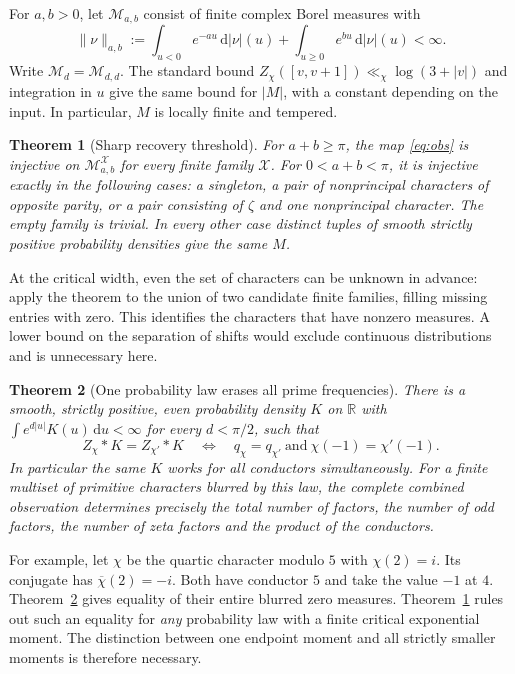 \documentclass[11pt]{article}
\newtheorem{theorem}{Theorem}
\newcommand{\RR}{\mathbb R}
\newcommand{\dd}{\,\mathrm d}
\newcommand{\cX}{\mathcal X}
\newcommand{\cM}{\mathcal M}
\begin{document}
For \(a,b>0\), let \(\cM_{a,b}\) consist of finite complex Borel measures with
\[
 \|\nu\|_{a,b}:=\int_{u<0}e^{-au}\dd|\nu|(u)+
                    \int_{u\ge0}e^{bu}\dd|\nu|(u)<\infty .
\]
Write \(\cM_d=\cM_{d,d}\). The standard bound
\(Z_\chi([v,v+1])\ll_\chi \log(3+|v|)\) \cite{count} and integration in \(u\)
give the same bound for \(|M|\), with a constant depending on the input. In particular, \(M\) is locally finite and tempered.

\begin{theorem}[Sharp recovery threshold]\label{th:main}
For \(a+b\ge\pi\), the map \eqref{eq:obs} is injective on \(\cM_{a,b}^{\cX}\) for every finite family \(\cX\).
For \(0<a+b<\pi\), it is injective exactly in the following cases:
a singleton, a pair of nonprincipal characters of opposite parity, or a pair consisting of \(\zeta\) and one nonprincipal character. The empty family is trivial. In every other case distinct tuples of smooth strictly positive probability densities give the same \(M\).
\end{theorem}

\noindent At the critical width, even the set of characters can be unknown in advance: apply the theorem to the union of two candidate finite families, filling missing entries with zero. This identifies the characters that have nonzero measures. A lower bound on the separation of shifts would exclude continuous distributions and is unnecessary here.

\begin{theorem}[One probability law erases all prime frequencies]\label{th:universal}
There is a smooth, strictly positive, even probability density \(K\) on \(\RR\) with
\(\int e^{d|u|}K(u)\dd u<\infty\) for every \(d<\pi/2\), such that
\[
 Z_{\chi}*K=Z_{\chi'}*K
 \quad\Longleftrightarrow\quad
 q_\chi=q_{\chi'}\ \text{and}\ \chi(-1)=\chi'(-1).
\]
In particular the same \(K\) works for all conductors simultaneously. For a finite multiset of primitive characters blurred by this law, the complete combined observation determines precisely the total number of factors, the number of odd factors, the number of zeta factors and the product of the conductors.
\end{theorem}

For example, let \(\chi\) be the quartic character modulo \(5\) with
\(\chi(2)=i\). Its conjugate has \(\overline\chi(2)=-i\). Both have conductor \(5\) and take the value \(-1\) at \(4\). Theorem~\ref{th:universal} gives equality of their entire blurred zero measures. Theorem~\ref{th:main} rules out such an equality for \emph{any} probability law with a finite critical exponential moment. The distinction between one endpoint moment and all strictly smaller moments is therefore necessary.
\end{document}
